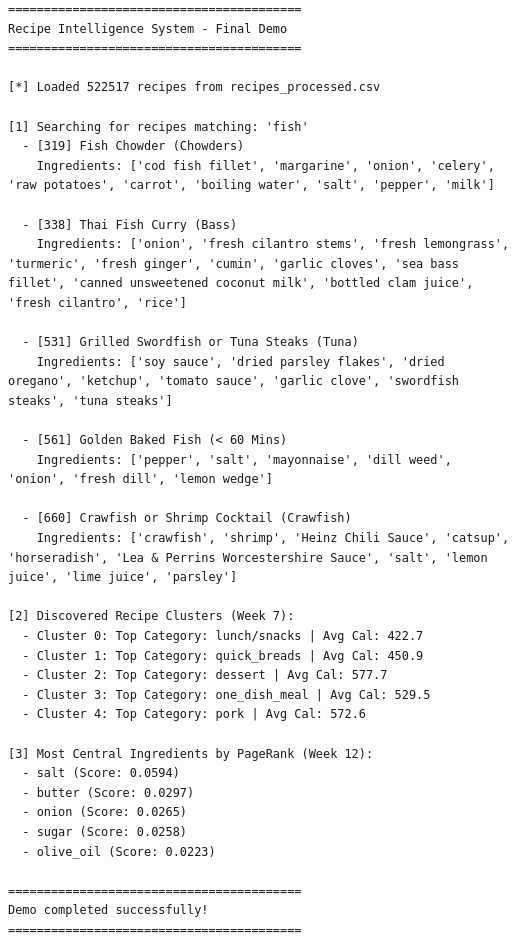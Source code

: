 \documentclass[11pt,a4paper]{article}
\begin{document}
\begin{verbatim}
=========================================
Recipe Intelligence System - Final Demo
=========================================

[*] Loaded 522517 recipes from recipes_processed.csv

[1] Searching for recipes matching: 'fish'
  - [319] Fish Chowder (Chowders)
    Ingredients: ['cod fish fillet', 'margarine', 'onion', 'celery', 'raw potatoes', 'carrot', 'boiling water', 'salt', 'pepper', 'milk']

  - [338] Thai Fish Curry (Bass)
    Ingredients: ['onion', 'fresh cilantro stems', 'fresh lemongrass', 'turmeric', 'fresh ginger', 'cumin', 'garlic cloves', 'sea bass fillet', 'canned unsweetened coconut milk', 'bottled clam juice', 'fresh cilantro', 'rice']

  - [531] Grilled Swordfish or Tuna Steaks (Tuna)
    Ingredients: ['soy sauce', 'dried parsley flakes', 'dried oregano', 'ketchup', 'tomato sauce', 'garlic clove', 'swordfish steaks', 'tuna steaks']

  - [561] Golden Baked Fish (< 60 Mins)
    Ingredients: ['pepper', 'salt', 'mayonnaise', 'dill weed', 'onion', 'fresh dill', 'lemon wedge']

  - [660] Crawfish or Shrimp Cocktail (Crawfish)
    Ingredients: ['crawfish', 'shrimp', 'Heinz Chili Sauce', 'catsup', 'horseradish', 'Lea & Perrins Worcestershire Sauce', 'salt', 'lemon juice', 'lime juice', 'parsley']

[2] Discovered Recipe Clusters (Week 7):
  - Cluster 0: Top Category: lunch/snacks | Avg Cal: 422.7
  - Cluster 1: Top Category: quick_breads | Avg Cal: 450.9
  - Cluster 2: Top Category: dessert | Avg Cal: 577.7
  - Cluster 3: Top Category: one_dish_meal | Avg Cal: 529.5
  - Cluster 4: Top Category: pork | Avg Cal: 572.6

[3] Most Central Ingredients by PageRank (Week 12):
  - salt (Score: 0.0594)
  - butter (Score: 0.0297)
  - onion (Score: 0.0265)
  - sugar (Score: 0.0258)
  - olive_oil (Score: 0.0223)

=========================================
Demo completed successfully!
=========================================
\end{verbatim}
\end{document}
